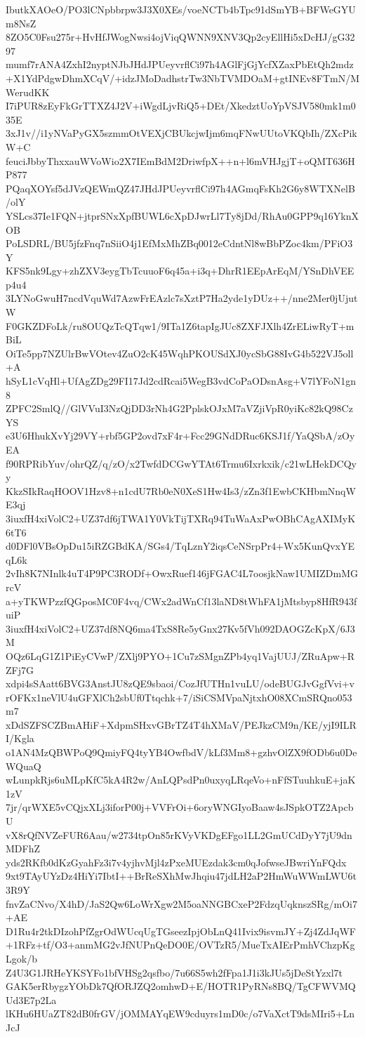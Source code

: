 IbutkXAOeO/PO3lCNpbbrpw3J3X0XEs/voeNCTb4bTpc91dSmYB+BFWeGYUm8NsZ
8ZO5C0Fsu275r+HvHfJWogNwsi4ojViqQWNN9XNV3Qp2cyEllHi5xDcHJ/gG3297
mumf7rANA4ZxhI2nyptNJbJHdJPUeyvrflCi97h4AGlFjGjYcfXZaxPbEtQh2mdz
+X1YdPdgwDhmXCqV/+idzJMoDadhstrTw3NbTVMDOaM+gtINEv8FTmN/MWerudKK
I7iPUR8zEyFkGrTTXZ4J2V+iWgdLjvRiQ5+DEt/XkedztUoYpVSJV580mk1m035E
3xJ1v//i1yNVaPyGX5szmmOtVEXjCBUkcjwIjm6mqFNwUUtoVKQbIh/ZXcPikW+C
feuciJbbyThxxauWVoWio2X7IEmBdM2DriwfpX++n+l6mVHJgjT+oQMT636HP877
PQaqXOYsf5dJVzQEWmQZ47JHdJPUeyvrflCi97h4AGmqFsKh2G6y8WTXNelB/olY
YSLcs37Ie1FQN+jtprSNxXpfBUWL6cXpDJwrLl7Ty8jDd/RhAu0GPP9q16YknXOB
PoLSDRL/BU5jfzFnq7nSiiO4j1EfMxMhZBq0012eCdntNl8wBbPZoc4km/PFiO3Y
KFS5nk9Lgy+zhZXV3eygTbTcuuoF6q45a+i3q+DhrR1EEpArEqM/YSnDhVEEp4u4
3LYNoGwuH7ncdVquWd7AzwFrEAzlc7sXztP7Ha2yde1yDUz++/nne2Mer0jUjutW
F0GKZDFoLk/ru8OUQzTcQTqw1/9ITa1Z6tapIgJUc8ZXFJXlh4ZrELiwRyT+mBiL
OiTe5pp7NZUlrBwVOtev4ZuO2cK45WqhPKOUSdXJ0ycSbG88IvG4b522VJ5oll+A
hSyL1cVqHl+UfAgZDg29FI17Jd2cdRcai5WegB3vdCoPaODsnAsg+V7lYFoN1gn8
ZPFC2SmlQ//GlVVuI3NzQjDD3rNh4G2PplskOJxM7aVZjiVpR0yiKc82kQ98CzYS
e3U6HhukXvYj29VY+rbf5GP2ovd7xF4r+Fcc29GNdDRuc6KSJ1f/YaQSbA/zOyEA
f90RPRibYuv/ohrQZ/q/zO/x2TwfdDCGwYTAt6Trmu6Ixrkxik/c21wLHekDCQyy
KkzSIkRaqHOOV1Hzv8+n1cdU7Rb0eN0XeS1Hw4Is3/zZn3f1EwbCKHbmNnqWE3qj
3iuxfH4xiVolC2+UZ37df6jTWA1Y0VkTijTXRq94TuWaAxPwOBhCAgAXIMyK6tT6
d0DFl0VBsOpDu15iRZGBdKA/SGs4/TqLznY2iqsCeNSrpPr4+Wx5KunQvxYEqL6k
2vIh8K7NInlk4uT4P9PC3RODf+OwxRuef146jFGAC4L7oosjkNaw1UMIZDmMGrcV
a+yTKWPzzfQGposMC0F4vq/CWx2adWnCf13laND8tWhFA1jMtsbyp8HfR943fuiP
3iuxfH4xiVolC2+UZ37df8NQ6ma4TxS8Re5yGnx27Kv5fVh092DAOGZcKpX/6J3M
OQz6LqG1Z1PiEyCVwP/ZXlj9PYO+1Cu7zSMgnZPb4yq1VajUUJ/ZRuApw+RZFj7G
xdpi4sSAatt6BVG3AnstJU8zQE9sbaoi/CozJfUTHn1vuLU/odeBUGJvGgfVvi+v
rOFKx1neVlU4uGFXlCh2sbUf0Ttqchk+7/iSiCSMVpaNjtxhO08XCmSRQno053m7
xDdSZFSCZBmAHiF+XdpmSHxvGBrTZ4T4hXMaV/PEJkzCM9n/KE/yjI9ILRI/Kgla
o1AN4MzQBWPoQ9QmiyFQ4tyYB4OwfbdV/kLf3Mm8+gzhvOlZX9fODb6u0DeWQuaQ
wLunpkRjs6uMLpKfC5kA4R2w/AnLQPsdPn0uxyqLRqeVo+nFfSTuuhkuE+jaK1zV
7jr/qrWXE5vCQjxXLj3iforP00j+VVFrOi+6oryWNGIyoBaaw4sJSpkOTZ2ApcbU
vX8rQfNVZeFUR6Aau/w2734tpOn85rKVyVKDgEFgo1LL2GmUCdDyY7jU9dnMDFhZ
yds2RKfb0dKzGyahFz3i7v4yjhvMjl4zPxeMUEzdak3cm0qJofwseJBwriYnFQdx
9xt9TAyUYzDz4HiYi7IbtI++BrReSXhMwJhqiu47jdLH2aP2HmWuWWmLWU6t3R9Y
fnvZaCNvo/X4hD/JaS2Qw6LoWrXgw2M5oaNNGBCxeP2FdzqUqknszSRg/mOi7+AE
D1Ru4r2tkDIzohPfZgrOdWUcqUgTGseezIpjObLnQ41Ivix9isvmJY+Zj4ZdJqWF
+1RFz+tf/O3+anmMG2vJfNUPnQeDO0E/OVTzR5/MueTxAIErPmhVChzpKgLgok/b
Z4U3G1JRHeYKSYFo1bfVHSg2qsfbo/7u66S5wh2fFpa1J1i3kJUs5jDeStYzxl7t
GAK5erRbygzYObDk7QfORJZQ2omhwD+E/HOTR1PyRNs8BQ/TgCFWVMQUd3E7p2La
lKHu6HUaZT82dB0frGV/jOMMAYqEW9cduyrs1mD0c/o7VaXctT9dsMIri5+LnJcJ
